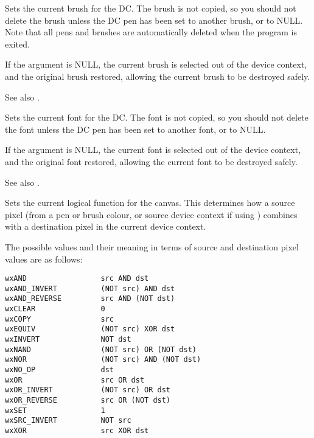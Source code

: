 \label{wxdcsetbrush}


Sets the current brush for the DC.  The brush is not copied, so you should not delete
the brush unless the DC pen has been set to another brush, or to NULL. Note that
all pens and brushes are automatically deleted when the program is exited.

If the argument is NULL, the current brush is selected out of the device
context, and the original brush restored, allowing the current brush to
be destroyed safely.

See also .

\label{wxdcsetfont}


Sets the current font for the DC. The font is not copied, so you should not delete
the font unless the DC pen has been set to another font, or to NULL.

If the argument is NULL, the current font is selected out of the device
context, and the original font restored, allowing the current font to
be destroyed safely.

See also .

\label{wxdcsetlogicalfunction}


Sets the current logical function for the canvas.  This determines how
a source pixel (from a pen or brush colour, or source device context if
using ) combines with a destination pixel in the
current device context.

The possible values
and their meaning in terms of source and destination pixel values are
as follows:

\begin{verbatim}
wxAND                 src AND dst
wxAND_INVERT          (NOT src) AND dst
wxAND_REVERSE         src AND (NOT dst)
wxCLEAR               0
wxCOPY                src
wxEQUIV               (NOT src) XOR dst
wxINVERT              NOT dst
wxNAND                (NOT src) OR (NOT dst)
wxNOR                 (NOT src) AND (NOT dst)
wxNO_OP               dst
wxOR                  src OR dst
wxOR_INVERT           (NOT src) OR dst
wxOR_REVERSE          src OR (NOT dst)
wxSET                 1
wxSRC_INVERT          NOT src
wxXOR                 src XOR dst
\end{verbatim}

